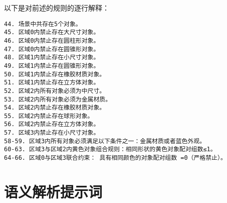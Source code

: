 以下是对前述的规则的逐行解释：
\begin{lstlisting}
44. 场景中共存在5个对象。
45. 区域0内禁止存在大尺寸对象。
46. 区域0内禁止存在圆柱形对象。
47. 区域0内禁止存在圆锥形对象。
48. 区域1内禁止存在小尺寸对象。
49. 区域1内禁止存在圆锥形对象。
50. 区域1内禁止存在橡胶材质对象。
51. 区域1内禁止存在立方体对象。
52. 区域2内所有对象必须为中尺寸。
53. 区域2内所有对象必须为金属材质。
54. 区域2内禁止存在橡胶材质对象。
55. 区域2内禁止存在球形对象。
56. 区域2内禁止存在立方体对象。
57. 区域3内禁止存在小尺寸对象。
58-59. 区域3内所有对象必须满足以下条件之一：金属材质或者蓝色外观。
60-63. 区域3与区域2内黄色对象组合规则：相同形状的黄色对象配对组数≤1。
64-66. 区域0与区域3联合约束： 具有相同颜色的对象配对组数 =0（严格禁止）。
\end{lstlisting}
\section{语义解析提示词}
\label{appendix:semantics-parsing-prompts}
